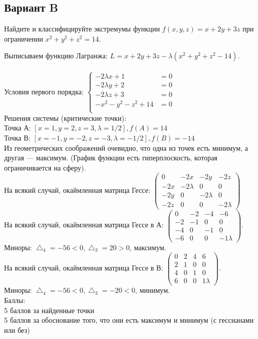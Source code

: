 \documentclass[addpoints, answers]{exam} %
\begin{document}
\subsection{Вариант B}
\begin{questions}
\question[10] Найдите и классифицируйте экстремумы функции $f(x,y,z)=x+2y+3z$ при ограничении $x^2+y^2+z^2=14$.\\

   \begin{solution}
Выписываем функцию Лагранжа: $L=x+2y+3z-\lambda (x^2+y^2+z^2-14)$.\\\\
Условия первого порядка:
$\left\{\begin{aligned}
-2\lambda x+1&=0\\
-2\lambda y+2&=0\\
-2\lambda z+3&=0\\
-x^2-y^2-z^2+14&=0\\
\end{aligned}\right.$\\
Решения системы (критические точки): \\
Точка А: $\left[ x=1,y=2,z=3,\lambda=1/2\right], f(A)=14$\\
Точка В: $\left[ x=-1,y=-2,z=-3,\lambda=-1/2\right], f(B)=-14$\\
Из геометрических соображений очевидно, что одна из точек есть минимум, а другая --- максимум. (График функции есть гиперплоскость, которая ограничивается на сферу).\\
На всякий случай, окаймленная матрица Гессе:
$\left(\begin{array}{cccc}
0 & -2x & -2y & -2z\\
-2x & -2\lambda & 0 & 0\\
-2y & 0 & -2\lambda & 0\\
-2z & 0 & 0 & -2\lambda
\end{array}\right)$\\
На всякий случай, окаймленная матрица Гессе в А: 
$\left(\begin{array}{cccc}
0 & -2 & -4 & -6\\
-2 & -1 & 0 & 0\\
-4 & 0 & -1 & 0\\
-6 & 0 & 0 & -1\lambda
\end{array}\right)$.\\
Миноры: $\bigtriangleup_4=-56<0, \bigtriangleup_3=20>0$, максимум.\\
На всякий случай, окаймленная матрица Гессе в В: 
$\left(\begin{array}{cccc}
0 & 2 & 4 & 6\\
2 & 1 & 0 & 0\\
4 & 0 & 1 & 0\\
6 & 0 & 0 & 1\lambda
\end{array}\right)$.\\
Миноры: $\bigtriangleup_4=-56<0, \bigtriangleup_3=-20<0$, минимум.\\
Баллы:\\
5 баллов за найденные точки\\
5 баллов за обоснование того, что они есть максимум и минимум (с гессианами или без)
   \end{solution}
    

\end{questions}
\end{document}
